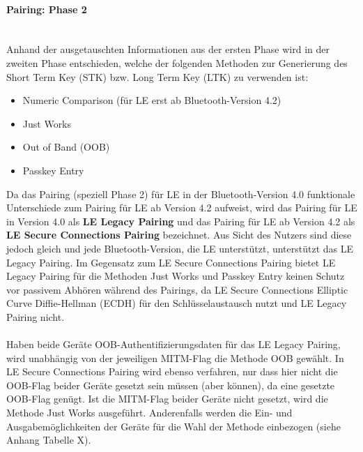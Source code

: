 \paragraph{Pairing: Phase 2} \mbox{} \vspace{0.2cm} \\
Anhand der ausgetauschten Informationen aus der ersten Phase wird in der zweiten Phase entschieden, welche der folgenden Methoden zur Generierung des Short Term Key (STK) bzw. Long Term Key (LTK) zu verwenden ist:

\begin{itemize}
    \item{Numeric Comparison (für LE erst ab Bluetooth-Version 4.2)}
    \item{Just Works}
    \item{Out of Band (OOB)}
    \item{Passkey Entry}
\end{itemize}

Da das Pairing (speziell Phase 2) für LE in der Bluetooth-Version 4.0 funktionale Unterschiede zum Pairing für LE ab Version 4.2 aufweist, wird das Pairing für LE in Version 4.0 als \textbf{LE Legacy Pairing} und das Pairing für LE ab Version 4.2 als \textbf{LE Secure Connections Pairing} bezeichnet. Aus Sicht des Nutzers sind diese jedoch gleich und jede Bluetooth-Version, die LE unterstützt, unterstützt das LE Legacy Pairing. Im Gegensatz zum LE Secure Connections Pairing bietet LE Legacy Pairing für die Methoden Just Works und Passkey Entry keinen Schutz vor passivem Abhören während des Pairings, da LE Secure Connections Elliptic Curve Diffie-Hellman (ECDH) für den Schlüsselaustausch nutzt und LE Legacy Pairing nicht. \cite{BtSpec4.2_248}
\\\\
Haben beide Geräte OOB-Authentifizierungsdaten für das LE Legacy Pairing, wird unabhängig von der jeweiligen MITM-Flag die Methode OOB gewählt. In LE Secure Connections Pairing wird ebenso verfahren, nur dass hier nicht die OOB-Flag beider Geräte gesetzt sein müssen (aber können), da eine gesetzte OOB-Flag genügt. Ist die MITM-Flag beider Geräte nicht gesetzt, wird die Methode Just Works ausgeführt. Anderenfalls werden die Ein- und Ausgabemöglichkeiten der Geräte für die Wahl der Methode einbezogen (siehe Anhang Tabelle X).

